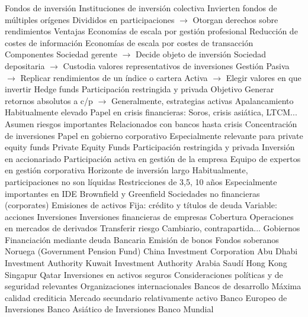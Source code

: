 \documentclass{nuevotema}
\begin{document}
\begin{esquemal}
			\3 Fondos de inversión
				\4 Instituciones de inversión colectiva
				\4[] Invierten fondos de múltiples orígenes
				\4[] Divididos en participaciones
				\4[] $\to$ Otorgan derechos sobre rendimientos
				\4 Ventajas
				\4[] Economías de escala por gestión profesional
				\4[] Reducción de costes de información
				\4[] Economías de escala por costes de transacción
				\4 Componentes
				\4[] Sociedad gerente
				\4[] $\to$ Decide objeto de inversión
				\4[] Sociedad depositaria
				\4[] $\to$ Custodia valores representativos de inversiones
				\4 Gestión
				\4[] Pasiva
				\4[] $\to$ Replicar rendimientos de un índice o cartera
				\4[] Activa
				\4[] $\to$ Elegir valores en que invertir
			\3 Hedge funds
				\4 Participación restringida y privada
				\4 Objetivo
				\4[] Generar retornos absolutos a c/p
				\4[] $\to$ Generalmente, estrategias activas
				\4 Apalancamiento
				\4[] Habitualmente elevado
				\4[] Papel en crisis financieras: Soros, crisis asiática, LTCM...
				\4[] Asumen riesgos importantes
				\4 Relacionados con bancos hasta crisis
				\4 Concentración de inversiones
				\4 Papel en gobierno corporativo
				\4[] Especialmente relevante para private equity funds
			\3 Private Equity Funds
				\4 Participación restringida y privada
				\4 Inversión en accionariado
				\4 Participación activa en gestión de la empresa
				\4 Equipo de expertos en gestión corporativa
				\4 Horizonte de inversión largo
				\4[] Habitualmente, participaciones no son líquidas
				\4[] Restricciones de 3,5, 10 años
				\4 Especialmente importantes en IDE
				\4[] Brownfield y Greenfield
		\2 Sociedades no financieras (corporates)
			\3 Emisiones de activos
				\4 Fija: crédito y títulos de deuda
				\4 Variable: acciones
			\3 Inversiones
				\4 Inversiones financieras de empresas
			\3 Cobertura
				\4 Operaciones en mercados de derivados
				\4 Transferir riesgo
				\4[] Cambiario, contrapartida...
		\2 Gobiernos
			\3 Financiación mediante deuda
				\4 Bancaria
				\4 Emisión de bonos
			\3 Fondos soberanos
				\4 Noruega (Government Pension Fund)
				\4 China Investment Corporation
				\4 Abu Dhabi Investment Authority
				\4 Kuwait Investment Authority
				\4 Arabia Saudí
				\4 Hong Kong
				\4 Singapur
				\4 Qatar
				\4 Inversiones en activos seguros
				\4[] Consideraciones políticas y de seguridad relevantes
		\2 Organizaciones internacionales
			\3 Bancos de desarrollo
				\4 Máxima calidad crediticia
				\4 Mercado secundario relativamente activo
				\4 Banco Europeo de Inversiones
				\4 Banco Asiático de Inversiones
				\4 Banco Mundial

\end{esquemal}
\end{document}
